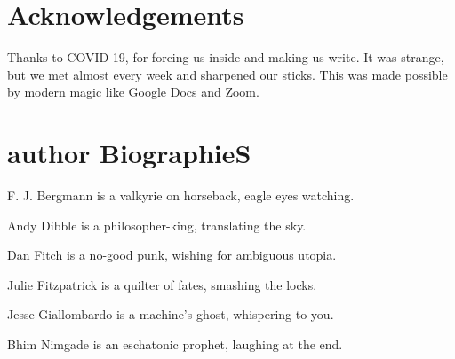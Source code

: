 \chapter*{\variexfont{}Acknowledgements}

\begin{flushleft}
Thanks to COVID-19, for forcing us inside and making us write.
It was strange, but we met almost every week and sharpened our sticks.
This was made possible by modern magic like Google Docs
and Zoom.


\chapter*{\variexfont{}author BiographieS}

F. J. Bergmann is a valkyrie on horseback, eagle eyes watching.

\vspace{2em}
Andy Dibble is a philosopher-king, translating the sky.

\vspace{2em}
Dan Fitch is a no-good punk, wishing for ambiguous utopia.

\vspace{2em}
Julie Fitzpatrick is a quilter of fates, smashing the locks.

\vspace{2em}
Jesse Giallombardo is a machine's ghost, whispering to you.

\vspace{2em}
Bhim Nimgade is an eschatonic prophet, laughing at the end.

\end{flushleft}


